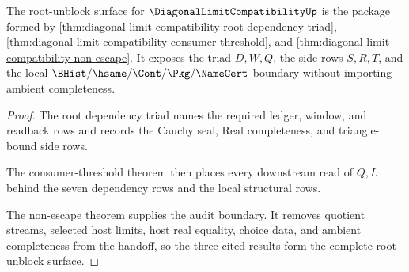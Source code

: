 \begin{theorem}
\label{thm:diagonal-limit-compatibility-audit-handoff}
The root-unblock surface for $\DiagonalLimitCompatibilityUp$ is the package
formed by \autoref{thm:diagonal-limit-compatibility-root-dependency-triad},
\autoref{thm:diagonal-limit-compatibility-consumer-threshold}, and
\autoref{thm:diagonal-limit-compatibility-non-escape}. It exposes the triad
$D,W,Q$, the side rows $S,R,T$, and the local $\BHist/\hsame/\Cont/\Pkg/
\NameCert$ boundary without importing ambient completeness.
\end{theorem}
\begin{proof}
The root dependency triad names the required ledger, window, and readback rows
and records the Cauchy seal, Real completeness, and triangle-bound side rows.

The consumer-threshold theorem then places every downstream read of $Q,L$
behind the seven dependency rows and the local structural rows.

The non-escape theorem supplies the audit boundary. It removes quotient
streams, selected host limits, host real equality, choice data, and ambient
completeness from the handoff, so the three cited results form the complete
root-unblock surface.
\end{proof}

